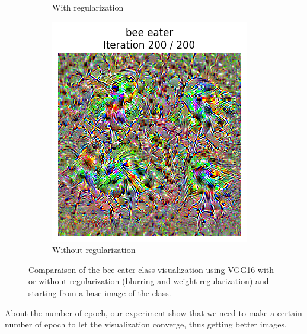 \begin{figure}[H]
\begin{subfigure}[t]{.33\textwidth}
        \caption{With regularization}
        \label{fig:class_viz_reg:sub2}
    \end{subfigure}%
    \begin{subfigure}[t]{.33\textwidth}
        \centering
        \includegraphics[width=\linewidth]{SqueezeNet/SqueezeNet_bird_animated_no_reg_last_frame.png}
        \caption{Without regularization}
        \label{fig:class_viz_reg:sub3}
    \end{subfigure}

    \caption{Comparaison of the bee eater class visualization using VGG16 with or without regularization (blurring and weight regularization) and starting from a base image of the class.}
    \label{fig:class_viz_reg}
\end{figure}


About the number of epoch, our experiment show that we need to make a certain number of epoch to let the visualization converge, thus getting better images.

